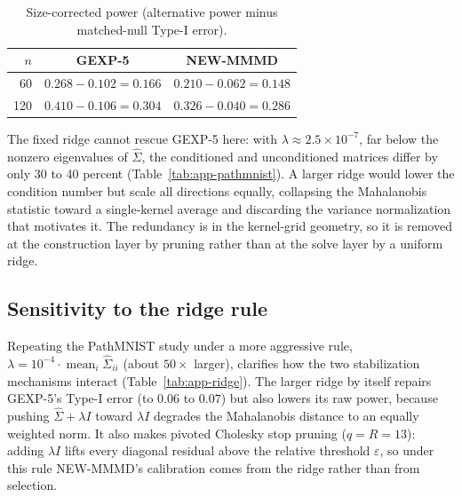\documentclass[12pt]{article}
\begin{document}
\begin{table}[H]
\centering
\caption{Size-corrected power (alternative power minus matched-null Type-I error).}
\label{tab:app-pathmnist-sizecorr}
\scriptsize
\begin{tabular}{rcc}
\toprule
$n$ & GEXP-5 & NEW-MMMD \\
\midrule
60  & $0.268-0.102=0.166$ & $0.210-0.062=0.148$ \\
120 & $0.410-0.106=0.304$ & $0.326-0.040=0.286$ \\
\bottomrule
\end{tabular}
\end{table}

The fixed ridge cannot rescue GEXP-5 here: with $\lambda\approx 2.5\times10^{-7}$, far below the nonzero eigenvalues of $\widehat{\Sigma}$, the conditioned and unconditioned matrices differ by only 30 to 40 percent (Table~\ref{tab:app-pathmnist}). A larger ridge would lower the condition number but scale all directions equally, collapsing the Mahalanobis statistic toward a single-kernel average and discarding the variance normalization that motivates it. The redundancy is in the kernel-grid geometry, so it is removed at the construction layer by pruning rather than at the solve layer by a uniform ridge.

\subsection{Sensitivity to the ridge rule}

Repeating the PathMNIST study under a more aggressive rule, $\lambda=10^{-4}\cdot\operatorname{mean}_i\widehat{\Sigma}_{ii}$ (about $50\times$ larger), clarifies how the two stabilization mechanisms interact (Table~\ref{tab:app-ridge}). The larger ridge by itself repairs GEXP-5's Type-I error (to $0.06$ to $0.07$) but also lowers its raw power, because pushing $\widehat{\Sigma}+\lambda I$ toward $\lambda I$ degrades the Mahalanobis distance to an equally weighted norm. It also makes pivoted Cholesky stop pruning ($q=R=13$): adding $\lambda I$ lifts every diagonal residual above the relative threshold $\varepsilon$, so under this rule NEW-MMMD's calibration comes from the ridge rather than from selection.
\end{document}
